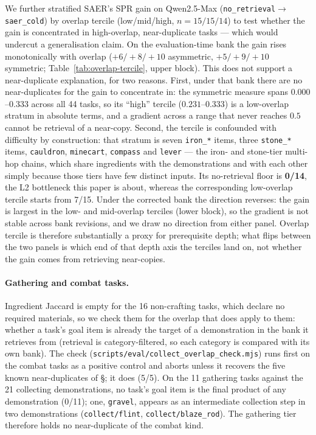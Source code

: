 \documentclass[letterpaper]{article} %
\newcommand{\bodyref}[1]{\getrefnumber{#1}}
\begin{document}
We further stratified SAER's SPR gain on Qwen2.5-Max
(\texttt{no\_retrieval}$\to$\texttt{saer\_cold}) by overlap tercile
(low/mid/high, $n{=}15/15/14$) to test whether the gain is
concentrated in high-overlap, near-duplicate tasks --- which would
undercut a generalisation claim.  On the evaluation-time bank the gain rises
monotonically with overlap ($+6/{+}8/{+}10$ asymmetric, $+5/{+}9/{+}10$
symmetric; Table~\ref{tab:overlap-tercile}, upper block).  This does not
support a near-duplicate explanation, for two reasons.  First, under that bank there are no near-duplicates for the
gain to concentrate in: the symmetric measure spans $0.000$--$0.333$
across all 44 tasks, so its ``high'' tercile ($0.231$--$0.333$) is a
low-overlap stratum in absolute terms, and a gradient across a range
that never reaches $0.5$ cannot be retrieval of a near-copy.  Second,
the tercile is confounded with difficulty by construction: that
stratum is seven \texttt{iron\_*} items, three \texttt{stone\_*}
items, \texttt{cauldron}, \texttt{minecart}, \texttt{compass} and
\texttt{lever} --- the iron- and stone-tier multi-hop chains, which
share ingredients with the demonstrations and with each other simply
because those tiers have few distinct inputs.  Its no-retrieval floor
is \textbf{0/14}, the L2 bottleneck this paper is about, whereas the
corresponding low-overlap tercile starts from 7/15.  Under the corrected bank
the direction reverses: the gain is largest in the low- and mid-overlap
terciles (lower block), so the gradient is not stable across bank revisions,
and we draw no direction from either panel.  Overlap tercile is therefore
substantially a proxy for prerequisite depth; what flips between the two
panels is which end of that depth axis the terciles land on, not whether the
gain comes from retrieving near-copies.

\paragraph{Gathering and combat tasks.}  Ingredient Jaccard is empty for the
16 non-crafting tasks, which declare no required materials, so we check them
for the overlap that does apply to them: whether a task's goal item is already
the target of a demonstration in the bank it retrieves from (retrieval is
category-filtered, so each category is compared with its own bank).  The check
(\texttt{scripts/\allowbreak eval/\allowbreak collect\_\allowbreak overlap\_\allowbreak check.mjs}) runs first on the combat
tasks as a positive control and aborts unless it recovers the five known
near-duplicates of \S\bodyref{sec:combat_design}; it does (5/5).  On the 11
gathering tasks against the 21 collecting demonstrations, no task's goal item
is the final product of any demonstration (0/11); one, \texttt{gravel},
appears as an intermediate collection step in two demonstrations
(\texttt{collect/flint}, \texttt{collect/blaze\_rod}).  The gathering tier
therefore holds no near-duplicate of the combat kind.
\end{document}
